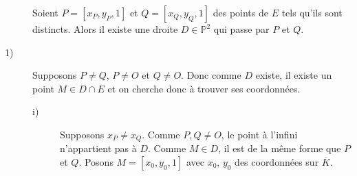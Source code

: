 \begin{demonstration}
    \begin{description}
        Soient $P = \left[ x_{P}, y_{P}, 1 \right]$ et $Q = \left[ x_{Q}, y_{Q}, 1 \right]$ des points de $E$ tels qu'ils sont distincts. Alors il existe une droite $D \in \mathbb{P} ^2$ qui passe par $P$ et $Q$.
        \item[1)] Supposons $P \neq Q$, $P \neq O$ et $Q \neq O$. Donc comme $D$ existe, il
            existe un point $M \in D \cap E$ et on cherche donc à trouver ses coordonnées.
            \begin{description}
        \item[i)] Supposons $x_{P} \neq x_{Q}$. 
            Comme $P,Q \neq O$, le point à l'infini n'appartient pas à $D$. Comme $M \in D$, il est de la même forme que $P$ et $Q$.
            Posons $M = \left[ x_0, y_0, 1 \right]$ avec $x_0$, $y_0$ des coordonnées sur $\overline{K}$.


\end{description}
\end{description}
\end{demonstration}
